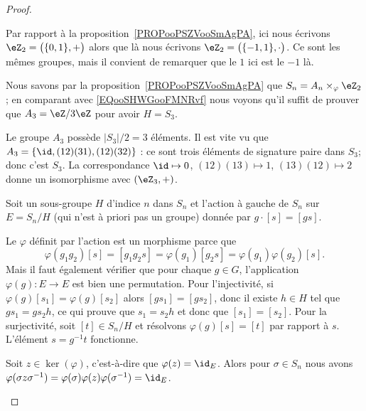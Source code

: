 \begin{proof}
\begin{subproof}
            Par rapport à la proposition~\ref{PROPooPSZVooSmAgPA}, ici nous écrivons \( \eZ_2=\big( \{ 0,1 \},+ \big)\) alors que là nous écrivons \( \eZ_2=\big( \{ -1,1 \},\cdot \big)\). Ce sont les mêmes groupes, mais il convient de remarquer que le \( 1\) ici est le \( -1\) là.

            Nous savons par la proposition~\ref{PROPooPSZVooSmAgPA} que \( S_n=A_n\times_{\varphi}\eZ_2\); en comparant avec \eqref{EQooSHWGooFMNRvf} nous voyons qu'il suffit de prouver que \( A_3=\eZ/3\eZ\) pour avoir \( H=S_3\).

            Le groupe \( A_3\) possède \( | S_3 |/2=3\) éléments. Il est vite vu que \( A_3=\{ \id,(12)(31), (12)(32) \}\) : ce sont trois éléments de signature paire dans \( S_3\); donc c'est \( S_3\). La correspondance \( \id\mapsto 0\), \( (12)(13)\mapsto 1\), \( (13)(12)\mapsto 2\) donne un isomorphisme avec \( (\eZ_3,+)\).

        \item[Pour \( n\geq 5\)]

            Soit un sous-groupe \( H\) d'indice \( n\) dans \( S_n\) et l'action à gauche de \( S_n\) sur \( E=S_n/H\) (qui n'est à priori pas un groupe) donnée par \( g\cdot [s]=[gs]\).

            \begin{subproof}
                \item[Morphisme \( \varphi\colon S_n\to S_E\)]

                    Le \( \varphi\) définit par l'action est un morphisme parce que
                    \begin{equation}
                        \varphi(g_1g_2)[s]=[g_1g_2s]=\varphi(g_1)[g_2s]=\varphi(g_1)\varphi(g_2)[s].
                    \end{equation}
                    Mais il faut également vérifier que pour chaque \( g\in G\), l'application \( \varphi(g)\colon E\to E\) est bien une permutation. Pour l'injectivité, si \( \varphi(g)[s_1]=\varphi(g)[s_2]\) alors \( [gs_1]=[gs_2]\), donc il existe \( h\in H\) tel que \( gs_1=gs_2h\), ce qui prouve que \( s_1=s_2h\) et donc que \( [s_1]=[s_2]\). Pour la surjectivité, soit \( [t]\in S_n/H\) et résolvons \( \varphi(g)[s]=[t]\) par rapport à \( s\). L'élément \( s=g^{-1} t\) fonctionne.

                \item[\( \ker(\varphi)\) est normal]

                    Soit \( z\in\ker(\varphi)\), c'est-à-dire que \( \varphi(z)=\id_E\). Alors pour \( \sigma\in S_n\) nous avons \( \varphi(\sigma z\sigma^{-1})=\varphi(\sigma)\varphi(z)\varphi(\sigma^{-1})=\id_E\).


\end{subproof}
\end{subproof}
\end{proof}
